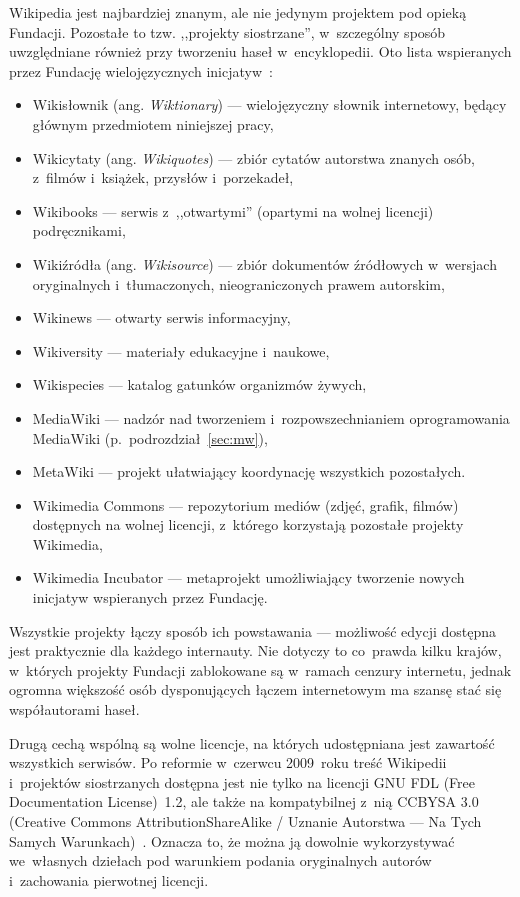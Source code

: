 Wikipedia jest najbardziej znanym, ale nie jedynym projektem pod opieką Fundacji. Pozostałe to tzw. ,,projekty siostrzane'', w~szczególny sposób uwzględniane również przy tworzeniu haseł w~encyklopedii. Oto lista wspieranych przez Fundację wielojęzycznych inicjatyw~\cite{wm:main}:
\begin{itemize}
	\item Wikisłownik (ang. \emph{Wiktionary}) --- wielojęzyczny słownik internetowy, będący głównym przedmiotem niniejszej pracy,
	\item Wikicytaty (ang. \emph{Wikiquotes}) --- zbiór cytatów autorstwa znanych osób, z~filmów i~książek, przysłów i~porzekadeł,
	\item Wikibooks --- serwis z~,,otwartymi'' (opartymi na wolnej licencji) podręcznikami,
	\item Wikiźródła (ang. \emph{Wikisource}) --- zbiór dokumentów źródłowych w~wersjach oryginalnych i~tłumaczonych, nieograniczonych prawem autorskim,
	\item Wikinews --- otwarty serwis informacyjny,
	\item Wikiversity --- materiały edukacyjne i~naukowe,
	\item Wikispecies --- katalog gatunków organizmów żywych,
	\item MediaWiki --- nadzór nad tworzeniem i~rozpowszechnianiem oprogramowania MediaWiki (p.~podrozdział~\ref{sec:mw}),
	\item Meta\dywiz{}Wiki --- projekt ułatwiający koordynację wszystkich pozostałych.
	\item Wikimedia Commons --- repozytorium mediów (zdjęć, grafik, filmów) dostępnych na wolnej licencji, z~którego korzystają pozostałe projekty Wikimedia,
	\item Wikimedia Incubator --- metaprojekt umożliwiający tworzenie nowych inicjatyw wspieranych przez Fundację.
\end{itemize}
Wszystkie projekty łączy sposób ich powstawania --- możliwość edycji dostępna jest praktycznie dla każdego internauty. Nie dotyczy to co~prawda kilku krajów, w~których projekty Fundacji zablokowane są w~ramach cenzury internetu, jednak ogromna większość osób dysponujących łączem internetowym ma szansę stać się współautorami haseł.

Drugą cechą wspólną są wolne licencje, na których udostępniana jest zawartość wszystkich serwisów. Po reformie w~czerwcu 2009~roku treść Wikipedii i~projektów siostrzanych dostępna jest nie tylko na licencji GNU FDL (Free Documentation License)~1.2, ale także na kompatybilnej z~nią CC\dywiz{}BY\dywiz{}SA 3.0 (Creative Commons Attribution\dywiz{}ShareAlike / Uznanie Autorstwa --- Na Tych Samych Warunkach)~\cite{wiki:license}. Oznacza to, że można ją dowolnie wykorzystywać we~własnych dziełach pod warunkiem podania oryginalnych autorów i~zachowania pierwotnej licencji.

